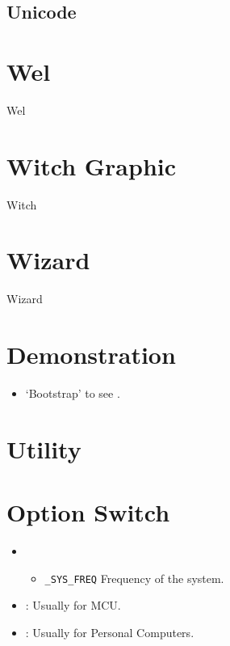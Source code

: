 \subsection{Unicode}





\section{Wel}
{Wel}

\section{Witch Graphic}
{Witch}

\section{Wizard}
{Wizard}

\section{Demonstration}

\begin{itemize}
	\item `Bootstrap' to see .
\end{itemize}

\section{Utility}

\section{Option Switch}

\begin{itemize}
	\item {}\begin{itemize}
		\item \verb`_SYS_FREQ` Frequency of the system.
	\end{itemize}
\end{itemize}

\begin{itemize}
	\item {}: Usually for MCU.
	\item {}: Usually for Personal Computers.
\end{itemize}


